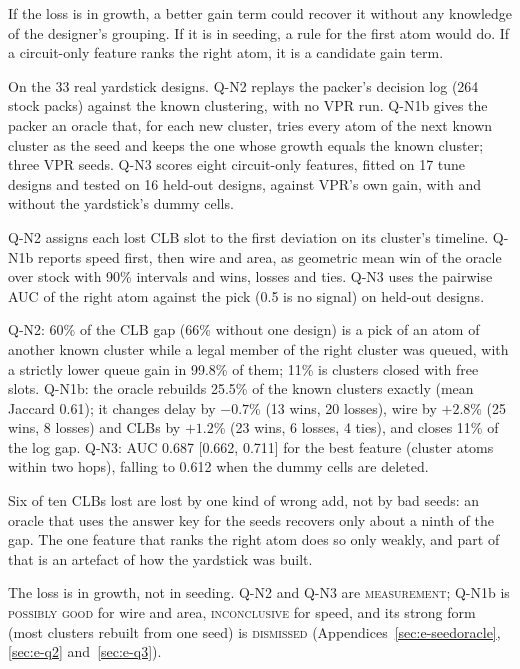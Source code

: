  If the loss is in growth, a better gain term could recover it without any knowledge of the designer's grouping. If it is in seeding, a rule for the first atom would do. If a circuit-only feature ranks the right atom, it is a candidate gain term.

 On the 33 real yardstick designs. Q-N2 replays the packer's decision log (264 stock packs) against the known clustering, with no VPR run. Q-N1b gives the packer an oracle that, for each new cluster, tries every atom of the next known cluster as the seed and keeps the one whose growth equals the known cluster; three VPR seeds. Q-N3 scores eight circuit-only features, fitted on 17 tune designs and tested on 16 held-out designs, against VPR's own gain, with and without the yardstick's dummy cells.

 Q-N2 assigns each lost CLB slot to the first deviation on its cluster's timeline. Q-N1b reports speed first, then wire and area, as geometric mean win of the oracle over stock with 90\% intervals and wins, losses and ties. Q-N3 uses the pairwise AUC of the right atom against the pick (0.5 is no signal) on held-out designs.

 Q-N2: 60\% of the CLB gap (66\% without one design) is a pick of an atom of another known cluster while a legal member of the right cluster was queued, with a strictly lower queue gain in 99.8\% of them; 11\% is clusters closed with free slots. Q-N1b: the oracle rebuilds 25.5\% of the known clusters exactly (mean Jaccard 0.61); it changes delay by $-0.7$\% (13 wins, 20 losses), wire by $+2.8$\% (25 wins, 8 losses) and CLBs by $+1.2$\% (23 wins, 6 losses, 4 ties), and closes 11\% of the log gap. Q-N3: AUC 0.687 [0.662, 0.711] for the best feature (cluster atoms within two hops), falling to 0.612 when the dummy cells are deleted.

 Six of ten CLBs lost are lost by one kind of wrong add, not by bad seeds: an oracle that uses the answer key for the seeds recovers only about a ninth of the gap. The one feature that ranks the right atom does so only weakly, and part of that is an artefact of how the yardstick was built.

 The loss is in growth, not in seeding. Q-N2 and Q-N3 are \textsc{measurement}; Q-N1b is \textsc{possibly good} for wire and area, \textsc{inconclusive} for speed, and its strong form (most clusters rebuilt from one seed) is \textsc{dismissed} (Appendices~\ref{sec:e-seedoracle}, \ref{sec:e-q2} and~\ref{sec:e-q3}).


